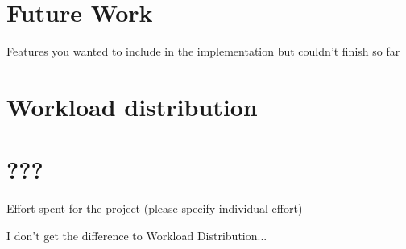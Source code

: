 \documentclass[a4paper,english,10pt,NET]{tumarticle}
\begin{document}
\section{Future Work}

Features you wanted to include in the implementation but couldn’t finish so far

\section{Workload distribution}

\section{???}

Effort spent for the project (please specify individual effort)

I don't get the difference to Workload Distribution...



\todos
\end{document}
